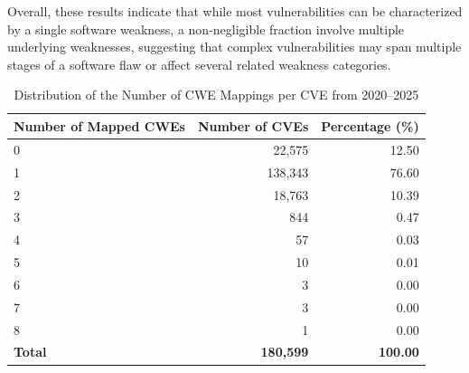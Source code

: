 \documentclass[conference,compsoc]{IEEEtran}
\begin{document}
Overall, these results indicate that while most vulnerabilities can be characterized by a single software weakness, a non-negligible fraction involve multiple underlying weaknesses, suggesting that complex vulnerabilities may span multiple stages of a software flaw or affect several related weakness categories.




\begin{table}[t]
\centering
\scriptsize
\setlength{\tabcolsep}{3pt}
\caption{Distribution of the Number of CWE Mappings per CVE from 2020--2025}
\label{tab:cwe_mapping_distribution_2020_2025}
\begin{tabular}{lrr}
\toprule
\textbf{Number of Mapped CWEs} & \textbf{Number of CVEs} & \textbf{Percentage (\%)} \\
\midrule
0 & 22,575  & 12.50 \\
1 & 138,343 & 76.60 \\
2 & 18,763  & 10.39 \\
3 & 844      & 0.47 \\
4 & 57       & 0.03 \\
5 & 10       & 0.01 \\
6 & 3        & 0.00 \\
7 & 3        & 0.00 \\
8 & 1        & 0.00 \\
\midrule
\textbf{Total} & \textbf{180,599} & \textbf{100.00} \\
\bottomrule
\end{tabular}
\end{table}
\end{document}

